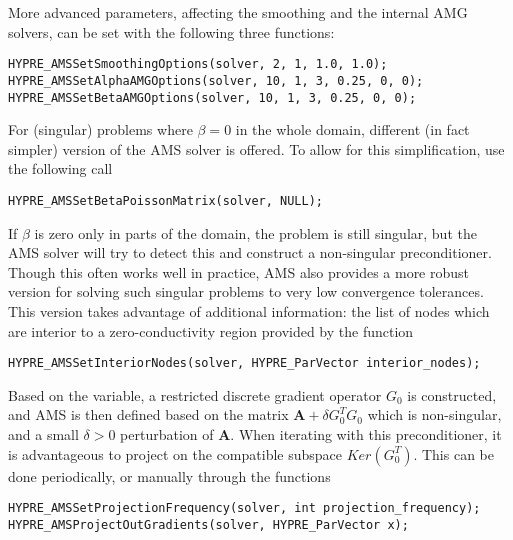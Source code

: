 More advanced parameters, affecting the smoothing and the
internal AMG solvers, can be set with the following three
functions:
\begin{display}\begin{verbatim}
HYPRE_AMSSetSmoothingOptions(solver, 2, 1, 1.0, 1.0);
HYPRE_AMSSetAlphaAMGOptions(solver, 10, 1, 3, 0.25, 0, 0);
HYPRE_AMSSetBetaAMGOptions(solver, 10, 1, 3, 0.25, 0, 0);
\end{verbatim}\end{display}

For (singular) problems where $\beta = 0$ in the whole domain,
different (in fact simpler) version of the AMS solver is offered.
To allow for this simplification, use the following \hypre{} call
\begin{display}\begin{verbatim}
HYPRE_AMSSetBetaPoissonMatrix(solver, NULL);
\end{verbatim}\end{display}

If $\beta$ is zero only in parts of the domain, the problem is still singular,
but the AMS solver will try to detect this and construct a non-singular
preconditioner. Though this often works well in practice, AMS also provides a
more robust version for solving such singular problems to very low convergence
tolerances. This version takes advantage of additional information: the list of
nodes which are interior to a zero-conductivity region provided by the function
\begin{display}\begin{verbatim}
HYPRE_AMSSetInteriorNodes(solver, HYPRE_ParVector interior_nodes);
\end{verbatim}\end{display}
Based on the  variable, a restricted discrete gradient
operator $G_0$ is constructed, and AMS is then defined based on the matrix
${\mathbf A}+\delta G_0^TG_0$ which is non-singular, and a small $\delta>0$ perturbation of
${\mathbf A}$. When iterating with this preconditioner, it is advantageous to project on
the compatible subspace $Ker(G_0^T)$. This can be done periodically, or manually
through the functions
\begin{display}\begin{verbatim}
HYPRE_AMSSetProjectionFrequency(solver, int projection_frequency);
HYPRE_AMSProjectOutGradients(solver, HYPRE_ParVector x);
\end{verbatim}\end{display}

